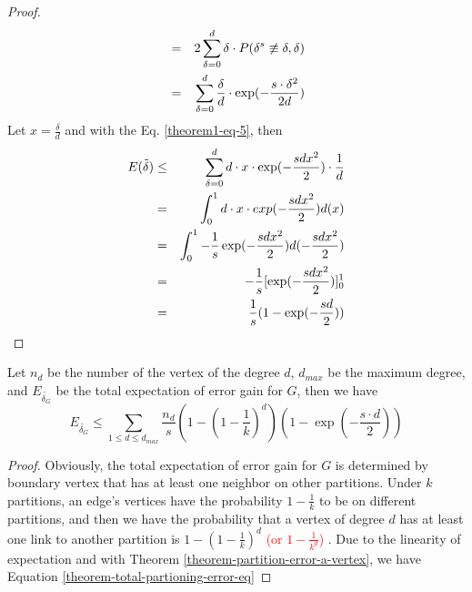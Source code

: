 \documentclass{sig-alternate-2013}
\begin{document}
\begin{proof}
\begin{eqnarray}
&=& 2\sum_{\delta=0}^{d} {\delta \cdot P( \delta^s \not\equiv \delta, \delta) } \notag \\
&=& \sum_{\delta=0}^{d} { \frac{\delta}{d} \cdot \exp(-\frac{s\cdot \delta^2}{2d})}
\end{eqnarray}
Let $x=\frac{\delta}{d}$ and with the Eq. \eqref{theorem1-eq-5}, then
\begin{eqnarray}
E(\tilde\delta) &\leq& \sum_{\delta=0}^{d} {d\cdot x\cdot \exp(-\frac{s d x^2}{2})\cdot \frac{1}{d}} \notag\\
&=& \int_0^{1} {d \cdot x \cdot exp(-\frac{s d x^2}{2})} d(x)\notag \\
&=& \int_0^{1} {-\frac{1}{s} \exp(-\frac{s d x^2}{2})d(-\frac{s d x^2}{2})} \notag \\
&=& -\frac{1}{s} [\exp(-\frac{s d x^2}{2})]_0^{1} \notag \\
&=& \frac{1}{s} (1-\exp(-\frac{s d}{2})) \notag
\end{eqnarray}
\end{proof}

\begin{theorem}\label{theorm-total-partioning-error}
 Let $n_d$ be the number of the vertex of the degree $d$, $d_{max}$ be the maximum degree, and $E_{\tilde{\delta_G}}$ be the total expectation of error gain for $G$, then we have
\begin{equation}\label{theorem-total-partioning-error-eq}
E_{\tilde{\delta_G}} \leq \sum_{1\leq d\leq d_{max}} {\frac{n_d}{s} (1-(1-\frac{1}{k})^d) (1-\exp(-\frac{s\cdot d}{2}))}
\end{equation}
\end{theorem}
\begin{proof}
Obviously, the total expectation of error gain for $G$  is determined by boundary vertex that has at least one neighbor on other partitions. Under $k$ partitions, an edge's  vertices have the probability $1-\frac{1}{k}$ to be on different partitions, and then we have the probability that a vertex of degree $d$ has at least one link to another partition is $1-(1-\frac{1}{k})^d$ \textcolor{red}{(or $1-\frac{1}{k^d}$)} . Due to the linearity of expectation and with Theorem \ref{theorem-partition-error-a-vertex}, we have Equation \ref{theorem-total-partioning-error-eq}
\end{proof}
\end{document}
